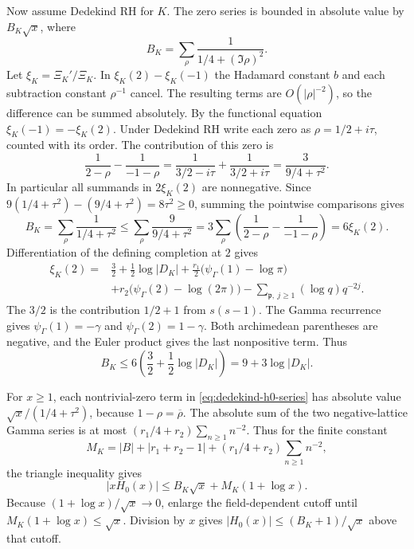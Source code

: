 \documentclass[11pt]{amsart}
\theoremstyle{definition}
\theoremstyle{remark}
\numberwithin{equation}{section}
\begin{document}
Now assume Dedekind RH for \(K\). The zero series is bounded in
absolute value by \(B_K\sqrt{x}\), where
\[
 B_K=\sum_\rho \frac{1}{1/4+(\Im\rho)^2}.
\]
Let \(\xi_K=\Xi_K'/\Xi_K\). In \(\xi_K(2)-\xi_K(-1)\)
the Hadamard constant \(b\) and each subtraction constant
\(\rho^{-1}\) cancel. The resulting terms are \(O(|\rho|^{-2})\),
so the difference can be summed absolutely. By the functional
equation \(\xi_K(-1)=-\xi_K(2)\). Under Dedekind RH write each
zero as \(\rho=1/2+i\tau\), counted with its order. The
contribution of this zero is
\[
 \frac{1}{2-\rho}-\frac{1}{-1-\rho}
 =\frac{1}{3/2-i\tau}+\frac{1}{3/2+i\tau}
 =\frac{3}{9/4+\tau^2}.
\]
In particular all summands in \(2\xi_K(2)\) are nonnegative.
Since \(9(1/4+\tau^2)-(9/4+\tau^2)=8\tau^2\geq0\), summing the
pointwise comparisons gives
\[
 B_K=\sum_\rho\frac{1}{1/4+\tau^2}
 \leq\sum_\rho\frac{9}{9/4+\tau^2}
 =3\sum_\rho\left(\frac1{2-\rho}-\frac1{-1-\rho}\right)
 =6\xi_K(2).
\]
Differentiation of the defining
completion at \(2\) gives
\begin{align*}
 \xi_K(2)={}&\frac32+\frac12\log|D_K|
   +\frac{r_1}{2}\bigl(\psi_\Gamma(1)-\log\pi\bigr)\\
   &+r_2\bigl(\psi_\Gamma(2)-\log(2\pi)\bigr)
   -\sum_{\mathfrak p,\ j\geq1}(\log q)q^{-2j}.
\end{align*}
The \(3/2\) is the contribution \(1/2+1\) from \(s(s-1)\).
The Gamma recurrence gives \(\psi_\Gamma(1)=-\gamma\) and
\(\psi_\Gamma(2)=1-\gamma\). Both archimedean parentheses are
negative, and the Euler product gives the last nonpositive term.
Thus
\[
 B_K\leq6\left(\frac32+\frac12\log|D_K|\right)=9+3\log|D_K|.
\]

For \(x\geq1\), each nontrivial-zero term in
\eqref{eq:dedekind-h0-series} has absolute value
\(\sqrt{x}/(1/4+\tau^2)\), because \(1-\rho=\overline\rho\).
The absolute sum of the two negative-lattice Gamma series is at
most \((r_1/4+r_2)\sum_{n\geq1}n^{-2}\). Thus for the finite
constant
\[
 M_K=|B|+|r_1+r_2-1|+(r_1/4+r_2)\sum_{n\geq1}n^{-2},
\]
the triangle inequality gives
\[
 |xH_0(x)|\leq B_K\sqrt{x}+M_K(1+\log x).
\]
Because \((1+\log x)/\sqrt{x}\to0\), enlarge the field-dependent
cutoff until \(M_K(1+\log x)\leq\sqrt{x}\). Division by \(x\) gives
\(|H_0(x)|\leq (B_K+1)/\sqrt{x}\) above that cutoff.
\end{document}
